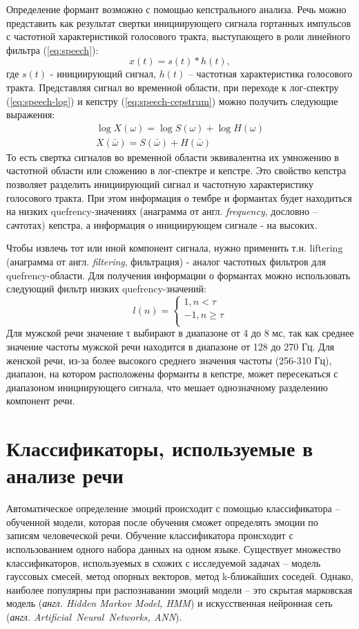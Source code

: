 Определение формант возможно с помощью кепстрального анализа. Речь можно представить как результат свертки инициирующего сигнала гортанных импульсов с частотной характеристикой голосового тракта, выступающего в роли линейного фильтра (\ref{eq:speech}):
\begin{equation}\label{eq:speech}
	x(t) = s(t) * h(t),
\end{equation}
где $s(t)$ - инициирующий сигнал, $h(t)$ -- частотная характеристика голосового тракта. Представляя сигнал во временной области, при переходе к лог-спектру (\ref{eq:speech-log}) и кепстру (\ref{eq:speech-cepstrum}) можно получить следующие выражения:
\begin{gather}
	\log X(\omega) = \log S(\omega) + \log H(\omega) \label{eq:speech-log}\\
	X(\bar{\omega}) = S(\bar{\omega}) + H(\bar{\omega}) \label{eq:speech-cepstrum}
\end{gather}
То есть свертка сигналов во временной области эквивалентна их умножению в частотной области или сложению в лог-спектре и кепстре. Это свойство кепстра позволяет разделить инициирующий сигнал и частотную характеристику голосового тракта. При этом информация о тембре и формантах будет находиться на низких quefrency-значениях (анаграмма от англ. \textit{frequency}, дословно -- сачтотах) кепстра, а информация о инициирующем сигнале - на высоких.

Чтобы извлечь тот или иной компонент сигнала, нужно применить т.н. liftering (анаграмма от англ. \textit{filtering}, фильтрация) - аналог частотных фильтров для quefrency-области. Для получения информации о формантах можно использовать следующий фильтр низких quefrency-значений:
\begin{equation}
	l(n)
	= 
	\begin{cases}
		1,  n < \tau\\
		-1,  n \ge \tau\\
	\end{cases}
\end{equation}
Для мужской речи значение τ выбирают в диапазоне от 4 до 8 мс, так как среднее значение частоты мужской речи находится в диапазоне от 128 до 270 Гц. Для женской речи, из-за более высокого среднего значения частоты (256-310 Гц), диапазон, на котором расположены форманты в кепстре, может пересекаться с диапазоном инициирующего сигнала, что мешает однозначному разделению компонент речи.

\section{Классификаторы, используемые в анализе речи}
Автоматическое определение эмоций происходит с помощью классификатора -- обученной модели, которая после обучения сможет определять эмоции по записям человеческой речи. Обучение классификатора происходит с использованием одного набора данных на одном языке. Существует множество классификаторов, используемых в схожих с исследуемой задачах -- модель гауссовых смесей, метод опорных векторов, метод k-ближайших соседей. Однако, наиболее популярны при распознавании эмоций модели -- это скрытая марковская модель (\textit{англ. Hidden Markov Model, HMM}) и искусственная нейронная сеть (\textit{англ. Artificial~Neural~Networks, ANN}).

